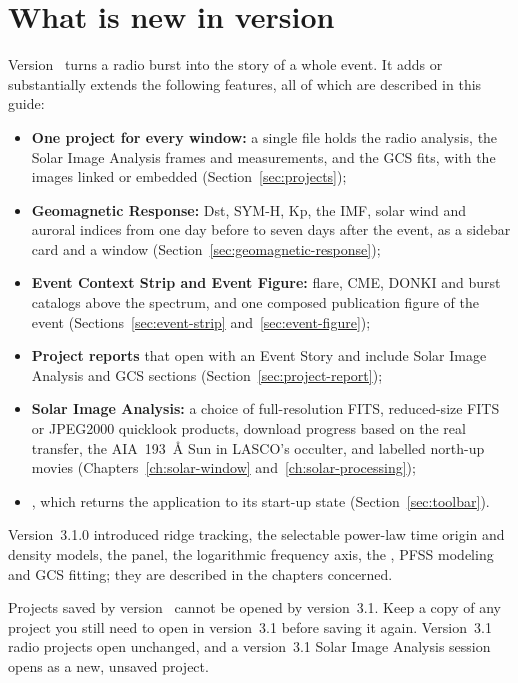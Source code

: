 \section{What is new in version \appversion}
\label{sec:whats-new}

Version~\appversion{} turns a radio burst into the story of a whole event. It adds or
substantially extends the following features, all of which are described in this guide:
\begin{itemize}
  \item \textbf{One project for every window:} a single  file holds the radio
    analysis, the Solar Image Analysis frames and measurements, and the GCS fits, with the
    images linked or embedded (Section~\ref{sec:projects});
  \item \textbf{Geomagnetic Response:} Dst, SYM-H, Kp, the IMF, solar wind and auroral indices
    from one day before to seven days after the event, as a sidebar card and a window
    (Section~\ref{sec:geomagnetic-response});
  \item \textbf{Event Context Strip and Event Figure:} flare, CME, DONKI and burst catalogs
    above the spectrum, and one composed publication figure of the event
    (Sections~\ref{sec:event-strip} and~\ref{sec:event-figure});
  \item \textbf{Project reports} that open with an Event Story and include Solar Image Analysis
    and GCS sections (Section~\ref{sec:project-report});
  \item \textbf{Solar Image Analysis:} a choice of full-resolution FITS, reduced-size FITS or
    JPEG2000 quicklook products, download progress based on the real transfer, the AIA~193~Å
    Sun in LASCO's occulter, and labelled north-up movies
    (Chapters~\ref{ch:solar-window} and~\ref{ch:solar-processing});
  \item {}, which returns the application to its start-up state
    (Section~\ref{sec:toolbar}).
\end{itemize}
Version~3.1.0 introduced ridge tracking, the selectable power-law time origin and density
models, the  panel, the logarithmic frequency axis, the ,
PFSS modeling and GCS fitting; they are described in the chapters concerned.

\begin{caution}
  Projects saved by version~\appversion{} cannot be opened by version~3.1. Keep a copy of any
  project you still need to open in version~3.1 before saving it again. Version~3.1 radio
  projects open unchanged, and a version~3.1  Solar Image Analysis session
  opens as a new, unsaved project.
\end{caution}

